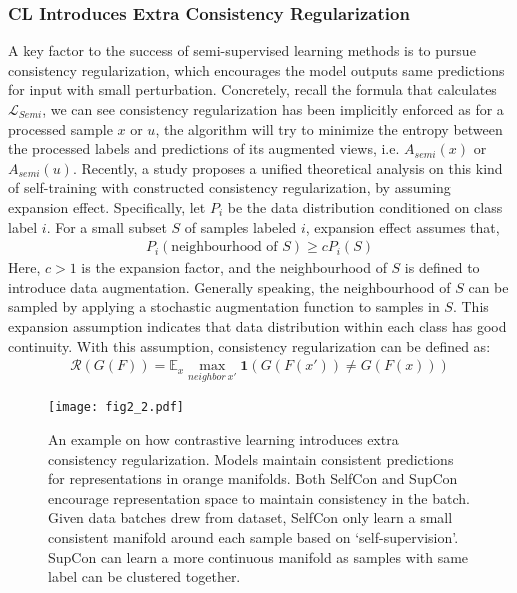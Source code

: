 \documentclass[letterpaper]{article} \usepackage{aaai22}  \usepackage{times}  \usepackage{helvet}  \usepackage{courier}  \usepackage[hyphens]{url}  \usepackage{graphicx} \usepackage{subfigure}
\begin{document}
\subsubsection{CL Introduces Extra Consistency Regularization }
A key factor to the success of semi-supervised learning methods is to pursue consistency regularization, which encourages the model outputs same predictions for input with small perturbation. Concretely, recall the formula that calculates $\mathcal{L}_{Semi}$, we can see consistency regularization has been implicitly enforced as for a processed sample $x$ or $u$, the algorithm will try to minimize the entropy between the processed labels and predictions of its augmented views, i.e. $A_{semi}(x)$ or $A_{semi}(u)$. Recently, a study \cite{wei2020theoretical} proposes a unified theoretical analysis on this kind of self-training with constructed consistency regularization, by assuming expansion effect. Specifically, let $P_i$ be the data distribution conditioned on class label $i$. For a small subset $S$ of samples labeled $i$, expansion effect assumes that, 
\begin{equation}
    \begin{aligned}
    P_i(\text{neighbourhood of }S) \geq cP_i(S) 
    \end{aligned}
\end{equation}
Here, $c > 1$ is the expansion factor, and the neighbourhood of $S$ is defined to introduce data augmentation. Generally speaking, the neighbourhood of $S$ can be sampled by applying a stochastic augmentation function to samples in $S$. This expansion assumption indicates that data distribution within each class has good continuity. With this assumption, consistency regularization can be defined as:
\begin{equation}
    \begin{aligned}
    \mathcal{R}(G(F)) = \mathbb{E}_x\mathop{max}\limits_{neighbor \ x'} \mathbf{1}(G(F(x'))\neq G(F(x)))
    \end{aligned}
\end{equation}
\begin{figure}[t]
\centering
\texttt{[image: fig2\_2.pdf]}
\caption{An example on how contrastive learning introduces extra consistency regularization. Models maintain consistent predictions for representations in orange manifolds. Both SelfCon and SupCon encourage representation space to maintain consistency in the batch. Given data batches drew from dataset, SelfCon only learn a small consistent manifold around each sample based on `self-supervision'. SupCon can learn a more continuous manifold as samples with same label can be clustered together.}
\label{fig2}
\end{figure}
\end{document}
